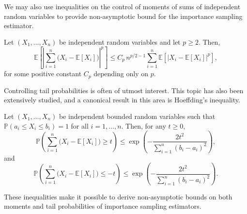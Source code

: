 \documentclass[english,graybox,envcountchap,envcountsame,sectrefs,shortlabels]{svmono}
\theoremstyle{style}
\begin{document}
We may also use  inequalities on the control of moments of sums of
independent random variables to provide non-asymptotic bound for the importance sampling estimator. 
\begin{theorem}\label{thm:MZ}
Let $(X_1,\ldots,X_n)$ be independent random variables and let
$p\geq 2$. Then,
\begin{equation}\label{eq:MZ}
\mathbb{E}\!\left[\left|
\sum_{i=1}^n \bigl(X_i-\mathbb{E}[X_i]\bigr)
\right|^p\right]
\leq
C_p\, n^{p/2-1}
\sum_{i=1}^n \mathbb{E}\!\left[\left|X_i-\mathbb{E}[X_i]\right|^p\right],
\end{equation}
for some positive constant $C_p$ depending only on $p$.
\end{theorem}
Controlling tail
probabilities is often of utmost interest. This topic has also been extensively studied, and a canonical
result in this area is Hoeffding's inequality.
\begin{theorem}\label{thm:Hoeffding}
Let $(X_1,\ldots,X_n)$ be independent bounded random variables such that
$\mathbb{P}(a_i \leq X_i \leq b_i)=1$ for all $i=1,\ldots,n$. Then, for any $t\geq 0$,
\[
\mathbb{P}\!\left(
\sum_{i=1}^n \bigl(X_i-\mathbb{E}[X_i]\bigr) \geq t
\right)
\leq
\exp\!\left(
-\frac{2t^2}{\sum_{i=1}^n (b_i-a_i)^2}
\right),
\]
and
\[
\mathbb{P}\!\left(
\sum_{i=1}^n \bigl(X_i-\mathbb{E}[X_i]\bigr) \leq -t
\right)
\leq
\exp\!\left(
-\frac{2t^2}{\sum_{i=1}^n (b_i-a_i)^2}
\right).
\]
\end{theorem}

These inequalities make it possible to derive non-asymptotic bounds on both
moments and tail probabilities of importance sampling estimators. 

\end{document}
